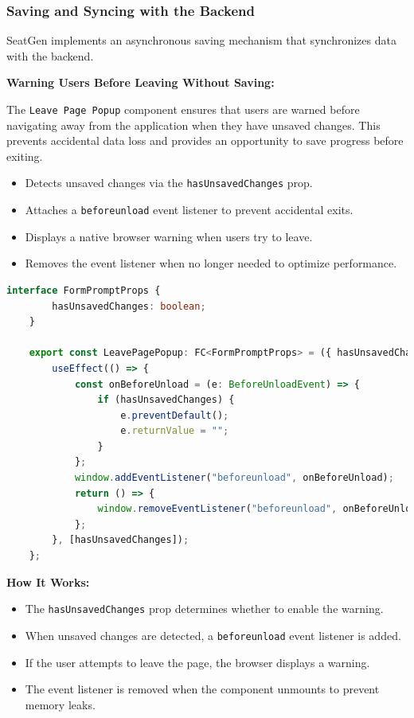 \subsubsection{Saving and Syncing with the Backend}
SeatGen implements an asynchronous saving mechanism that synchronizes data with the backend.

\textbf{Warning Users Before Leaving Without Saving:}

The \texttt{Leave Page Popup} component ensures that users are warned before navigating away from the application when they have unsaved changes. This prevents accidental data loss and provides an opportunity to save progress before exiting.

\begin{itemize}
    \item Detects unsaved changes via the \texttt{hasUnsavedChanges} prop.
    \item Attaches a \texttt{beforeunload} event listener to prevent accidental exits.
    \item Displays a native browser warning when users try to leave.
    \item Removes the event listener when no longer needed to optimize performance.
\end{itemize}

\begin{lstlisting}[language=TypeScript, caption=Auto-Saving on Unload, label=lst:auto-save-seats]
    interface FormPromptProps {
        hasUnsavedChanges: boolean;
    }
    
    export const LeavePagePopup: FC<FormPromptProps> = ({ hasUnsavedChanges }) => {
        useEffect(() => {
            const onBeforeUnload = (e: BeforeUnloadEvent) => {
                if (hasUnsavedChanges) {
                    e.preventDefault();
                    e.returnValue = "";
                }
            };
            window.addEventListener("beforeunload", onBeforeUnload);
            return () => {
                window.removeEventListener("beforeunload", onBeforeUnload);
            };
        }, [hasUnsavedChanges]);
    };
\end{lstlisting}


\textbf{How It Works:}
\begin{itemize}
    \item The \texttt{hasUnsavedChanges} prop determines whether to enable the warning.
    \item When unsaved changes are detected, a \texttt{beforeunload} event listener is added.
    \item If the user attempts to leave the page, the browser displays a warning.
    \item The event listener is removed when the component unmounts to prevent memory leaks.
\end{itemize}

